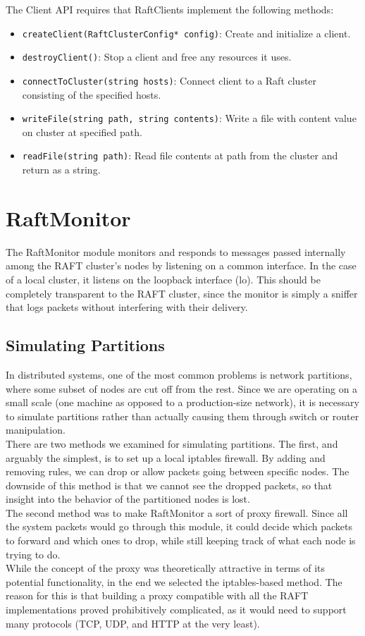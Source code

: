 \documentclass[UTF8]{article}
\begin{document}
The Client API requires that RaftClients implement the following methods:

\begin{itemize}
\item \texttt{createClient(RaftClusterConfig* config)}: Create and initialize a client.
\item \texttt{destroyClient()}: Stop a client and free any resources it uses.
\item \texttt{connectToCluster(string hosts)}: Connect client to a Raft cluster consisting of the specified hosts.
\item \texttt{writeFile(string path, string contents)}: Write a file with content value on cluster at specified path.
\item \texttt{readFile(string path)}: Read file contents at path from the cluster and return as a string.
\end{itemize}

\section{RaftMonitor}

The RaftMonitor module monitors and responds to messages passed internally among the RAFT cluster's nodes by listening on a common interface. In the case of a local cluster, it listens on the loopback interface (lo). This should be completely transparent to the RAFT cluster, since the monitor is simply a sniffer that logs packets without interfering with their delivery. 

\subsection{Simulating Partitions}

In distributed systems, one of the most common problems is network partitions, where some subset of nodes are cut off from the rest. Since we are operating on a small scale (one machine as opposed to a production-size network), it is necessary to simulate partitions rather than actually causing them through switch or router manipulation.
\\ \indent There are two methods we examined for simulating partitions. The first, and arguably the simplest, is to set up a local iptables firewall. By adding and removing rules, we can drop or allow packets going between specific nodes. The downside of this method is that we cannot see the dropped packets, so that insight into the behavior of the partitioned nodes is lost.
\\ \indent The second method was to make RaftMonitor a sort of proxy firewall. Since all the system packets would go through this module, it could decide which packets to forward and which ones to drop, while still keeping track of what each node is trying to do.
\\ \indent While the concept of the proxy was theoretically attractive in terms of its potential functionality, in the end we selected the iptables-based method. The reason for this is that building a proxy compatible with all the RAFT implementations proved prohibitively complicated, as it would need to support many protocols (TCP, UDP, and HTTP at the very least). 
\end{document}
